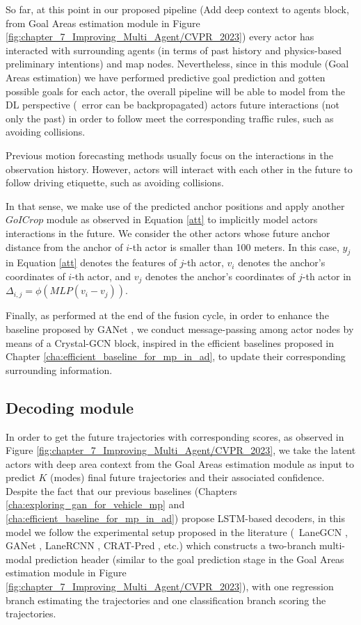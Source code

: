 So far, at this point in our proposed pipeline (Add deep context to agents block, from Goal Areas estimation module in Figure \ref{fig:chapter_7_Improving_Multi_Agent/CVPR_2023}) every actor has interacted with surrounding agents (in terms of past history and physics-based preliminary intentions) and map nodes. Nevertheless, since in this module (Goal Areas estimation) we have performed predictive goal prediction and gotten possible goals for each actor, the overall pipeline will be able to model from the \ac{DL} perspective (\ie \ error can be backpropagated) actors future interactions (not only the past) in order to follow meet the corresponding traffic rules, such as avoiding collisions.

Previous motion forecasting methods usually focus on the interactions in the observation history. 
However, actors will interact with each other in the future to follow driving etiquette, such as avoiding collisions. 
 
In that sense, we make use of the predicted anchor positions and apply another $GoICrop$ module as observed in Equation \ref{att} to implicitly model actors interactions in the future. We consider the other actors whose future anchor distance from the anchor of $i$-th actor is smaller than 100 meters. In this case, $y_j$ in Equation \ref{att} denotes the features of $j$-th actor, $v_i$ denotes the anchor's coordinates of $i$-th actor, and $v_j$ denotes the anchor's coordinates of $j$-th actor in $\Delta_{i,j}=\phi(MLP(v_i-v_j))$.

Finally, as performed at the end of the fusion cycle, in order to enhance the baseline proposed by GANet \cite{wang2022ganet}, we conduct message-passing among actor nodes by means of a Crystal-\ac{GCN} block, inspired in the efficient baselines proposed in Chapter \ref{cha:efficient_baseline_for_mp_in_ad}, to update their corresponding surrounding information.

\subsection{Decoding module}
\label{subsec:7_improving_efficiency_decoding_module}

In order to get the future trajectories with corresponding scores, as observed in Figure \ref{fig:chapter_7_Improving_Multi_Agent/CVPR_2023}, we take the latent actors with deep area context from the Goal Areas estimation module as input to predict $K$ (modes) final future trajectories and their associated confidence. Despite the fact that our previous baselines (Chapters \ref{cha:exploring_gan_for_vehicle_mp} and \ref{cha:efficient_baseline_for_mp_in_ad}) propose \ac{LSTM}-based decoders, in this model we follow the experimental setup proposed in the literature (\eg \ LaneGCN \cite{liang2020learning}, GANet \cite{wang2022ganet}, LaneRCNN \cite{zeng2021lanercnn}, CRAT-Pred \cite{schmidt2022crat}, etc.) which constructs a two-branch multi-modal prediction header (similar to the goal prediction stage in the Goal Areas estimation module in Figure \ref{fig:chapter_7_Improving_Multi_Agent/CVPR_2023}), with one regression branch estimating the trajectories and one classification branch scoring the trajectories.

